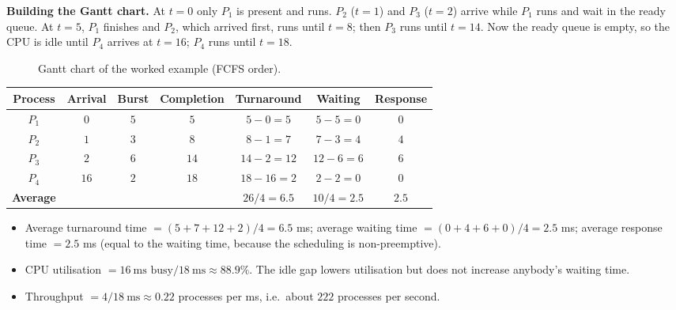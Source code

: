 \documentclass[11pt,a4paper]{article}
\begin{document}
\textbf{Building the Gantt chart.} At $t=0$ only $P_1$ is present and runs. $P_2$ ($t=1$) and $P_3$ ($t=2$) arrive while $P_1$ runs and wait in the ready queue. At $t=5$, $P_1$ finishes and $P_2$, which arrived first, runs until $t=8$; then $P_3$ runs until $t=14$. Now the ready queue is empty, so the CPU is idle until $P_4$ arrives at $t=16$; $P_4$ runs until $t=18$.

\begin{figure}[H]
\centering
{}
\caption{Gantt chart of the worked example (FCFS order).}
\end{figure}

\begin{center}
\renewcommand{\arraystretch}{1.3}
\begin{tabular}{@{}ccccccc@{}}
\toprule
\textbf{Process} & \textbf{Arrival} & \textbf{Burst} & \textbf{Completion} & \textbf{Turnaround} & \textbf{Waiting} & \textbf{Response} \\
\midrule
$P_1$ & $0$ & $5$ & $5$ & $5-0=5$ & $5-5=0$ & $0$ \\
$P_2$ & $1$ & $3$ & $8$ & $8-1=7$ & $7-3=4$ & $4$ \\
$P_3$ & $2$ & $6$ & $14$ & $14-2=12$ & $12-6=6$ & $6$ \\
$P_4$ & $16$ & $2$ & $18$ & $18-16=2$ & $2-2=0$ & $0$ \\
\midrule
\textbf{Average} & & & & $26/4 = 6.5$ & $10/4 = 2.5$ & $2.5$ \\
\bottomrule
\end{tabular}
\end{center}

\begin{itemize}
  \item Average turnaround time $= (5+7+12+2)/4 = 6.5$ ms; average waiting time $= (0+4+6+0)/4 = 2.5$ ms; average response time $= 2.5$ ms (equal to the waiting time, because the scheduling is non-preemptive).
  \item CPU utilisation $= 16\ \text{ms busy} / 18\ \text{ms} \approx 88.9\%$. The idle gap lowers utilisation but does not increase anybody's waiting time.
  \item Throughput $= 4 / 18\ \text{ms} \approx 0.22$ processes per ms, i.e.\ about $222$ processes per second.
\end{itemize}
\end{document}
